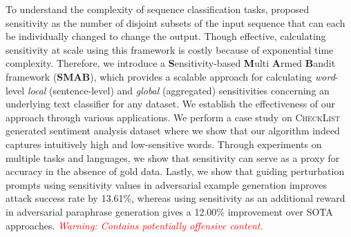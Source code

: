 To understand the complexity of sequence classification tasks, \citet{hahn-etal-2021-sensitivity} proposed sensitivity as the number of disjoint subsets of the input sequence that can each be individually changed to change the output. Though effective, calculating sensitivity at scale using this framework is costly because of exponential time complexity. Therefore, we introduce a \textbf{S}ensitivity-based \textbf{M}ulti \textbf{A}rmed \textbf{B}andit framework (\textbf{SMAB}), which provides a scalable approach for calculating \textit{word}-level \textit{local} (sentence-level) and \textit{global} (aggregated) sensitivities concerning an underlying text classifier for any dataset. We establish the effectiveness of our approach through various applications. We perform a case study on \textsc{CheckList} generated sentiment analysis dataset where we show that our algorithm indeed captures intuitively high and low-sensitive words. Through experiments on multiple tasks and languages, we show that sensitivity can serve as a proxy for accuracy in the absence of gold data. Lastly, we show that guiding perturbation prompts using sensitivity values in adversarial example generation improves attack success rate by 13.61\%, whereas using sensitivity as an additional reward in adversarial paraphrase generation gives a 12.00\% improvement over SOTA approaches. \textcolor{red}{\textit{Warning: Contains potentially offensive content.}}